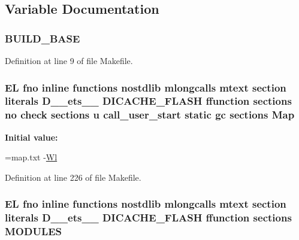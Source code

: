 \subsection{Variable Documentation}
\hypertarget{Makefile_aaa9bbf75d7f8fc94a5c7dd9504b7a178}{
\subsubsection[{B\-U\-I\-L\-D\-\_\-\-B\-A\-S\-E}]{\setlength{\rightskip}{0pt plus 5cm}B\-U\-I\-L\-D\-\_\-\-B\-A\-S\-E}}\label{Makefile_aaa9bbf75d7f8fc94a5c7dd9504b7a178}


Definition at line 9 of file Makefile.

\hypertarget{Makefile_a3f923b64cf6726ab0bfdd17b9aff0a96}{
\subsubsection[{Map}]{\setlength{\rightskip}{0pt plus 5cm}E\-L fno inline functions nostdlib mlongcalls mtext section literals D\-\_\-\-\_\-ets\-\_\-\-\_\- D\-I\-C\-A\-C\-H\-E\-\_\-\-F\-L\-A\-S\-H ffunction sections no check sections u call\-\_\-user\-\_\-start static gc sections Map\hspace{0.3cm}{\ttfamily [static]}}}\label{Makefile_a3f923b64cf6726ab0bfdd17b9aff0a96}
{\bfseries Initial value\-:}
\begin{DoxyCode}
=map.txt  
-\hyperlink{Makefile_afb1782b240d70229ae5bc6b111f9794a}{Wl}
\end{DoxyCode}


Definition at line 226 of file Makefile.

\hypertarget{Makefile_af8b8a61c029c5ab0a5518b7f5421c6ac}{
\subsubsection[{M\-O\-D\-U\-L\-E\-S}]{\setlength{\rightskip}{0pt plus 5cm}E\-L fno inline functions nostdlib mlongcalls mtext section literals D\-\_\-\-\_\-ets\-\_\-\-\_\- D\-I\-C\-A\-C\-H\-E\-\_\-\-F\-L\-A\-S\-H ffunction sections M\-O\-D\-U\-L\-E\-S}}\label{Makefile_af8b8a61c029c5ab0a5518b7f5421c6ac}


